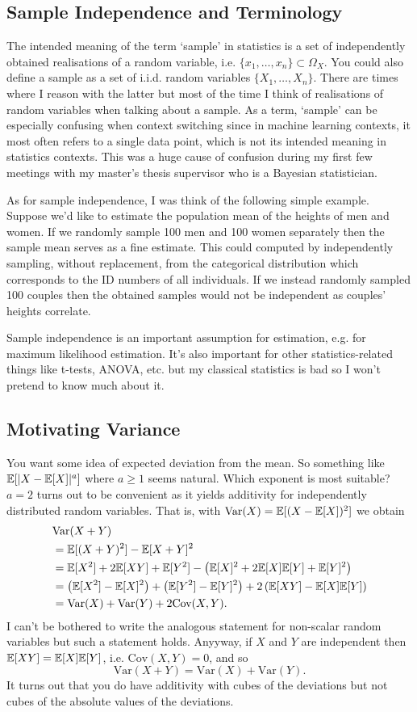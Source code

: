 \documentclass[11pt]{article}
\begin{document}
\begin{appendices}
\subsection{Sample Independence and Terminology}
The intended meaning of the term `sample' in statistics is a set of independently obtained realisations of a random variable, i.e. $\{x_1,\dots,x_n\}\subset\Omega_X$. You could also define a sample as a set of i.i.d. random variables $\{X_1,\dots,X_n\}$. There are times where I reason with the latter but most of the time I think of realisations of random variables when talking about a sample. As a term, `sample' can be especially confusing when context switching since in machine learning contexts, it most often refers to a single data point, which is not its intended meaning in statistics contexts. This was a huge cause of confusion during my first few meetings with my master's thesis supervisor who is a Bayesian statistician.

As for sample independence, I was think of the following simple example. Suppose we'd like to estimate the population mean of the heights of men and women. If we randomly sample 100 men and 100 women separately then the sample mean serves as a fine estimate. This could computed by independently sampling, without replacement, from the categorical distribution which corresponds to the ID numbers of all individuals. If we instead randomly sampled 100 couples then the obtained samples would not be independent as couples' heights correlate.

Sample independence is an important assumption for estimation, e.g. for maximum likelihood estimation. It's also important for other statistics-related things like t-tests, ANOVA, etc. but my classical statistics is bad so I won't pretend to know much about it.

\subsection{Motivating Variance}
You want some idea of expected deviation from the mean. So something like $\mathbb{E}[|X-\mathbb{E}[X]|^a]$ where $a\geq1$ seems natural. Which exponent is most suitable? $a=2$ turns out to be convenient as it yields additivity for independently distributed random variables. That is, with $\text{Var}(X)=\mathbb{E}[(X-\mathbb{E}[X])^2]$ we obtain
\begin{align*}
    &
    \text{Var}(X+Y)\\
    &=
    \mathbb{E}[(X+Y)^2]-\mathbb{E}[X+Y]^2\\
    &=
    \mathbb{E}[X^2]+2\mathbb{E}[XY]+\mathbb{E}[Y^2]-\left(\mathbb{E}[X]^2+2\mathbb{E}[X]\mathbb{E}[Y]+\mathbb{E}[Y]^2\right)\\
    &=
    \left(\mathbb{E}[X^2]-\mathbb{E}[X]^2\right)+\left(\mathbb{E}[Y^2]-\mathbb{E}[Y]^2\right)+2\left(\mathbb{E}[XY]-\mathbb{E}[X]\mathbb{E}[Y]\right)\\
    &=
    \text{Var}(X)+\text{Var}(Y)+2\text{Cov}(X,Y).
\end{align*}
I can't be bothered to write the analogous statement for non-scalar random variables but such a statement holds. Anyyway, if $X$ and $Y$ are independent then $\mathbb{E}[XY]=\mathbb{E}[X]\mathbb{E}[Y]$, i.e. $\text{Cov}(X,Y)=0$, and so
$$
\text{Var}(X+Y)
=
\text{Var}(X)+\text{Var}(Y).
$$
It turns out that you do have additivity with cubes of the deviations but not cubes of the absolute values of the deviations.


\end{appendices}
\end{document}
